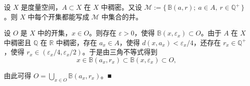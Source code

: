 \begin{lemma}

设 $ X $ 是度量空间，$ A \subset X $ 在 $ X $ 中稠密。又设 $ \mathcal{M} := \{\, \mathbb{B}(a, r) ;\ a \in A,\ r \in \mathbb{Q}^{+} \,\} $。则 $ X $ 中每个开集都能写成 $ \mathcal{M} $ 中集合的并。

\proofhead
设 $ O $ 是 $ X $ 中的开集，$ x \in O $。则存在 $ \varepsilon > 0 $，使得 $ \mathbb{B}(x, \varepsilon_{x}) \subset O $。由于 $ A $ 在 $ X $ 中稠密且 $ \mathbb{Q} $ 在 $ \mathbb{R} $ 中稠密，存在 $ a_{x} \in A $，使得 $ d(x, a_{x}) < \varepsilon_{x}/4 $，还存在 $ r_{x} \in \mathbb{Q}^{+} $，使得 $ r_{x} \in (\varepsilon_{x}/4, \varepsilon_{x}/2) $。于是由三角不等式得到
\[
x \in \mathbb{B}(a_{x}, r_{x}) \subset \mathbb{B}(x, \varepsilon_{x}) \subset O ,
\]

由此可得 $ O = \bigcup_{x \in O} \mathbb{B}(a_{x}, r_{x}) $。\nobreak\hspace{0.35em}■

\end{lemma}

